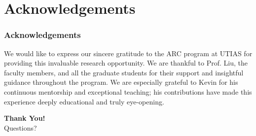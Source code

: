 \documentclass{beamer}
\begin{document}
\section{Acknowledgements}

\begin{frame}
\frametitle{Acknowledgements}
We would like to express our sincere gratitude to the ARC program at UTIAS for providing this invaluable research opportunity. We are thankful to Prof. Liu, the faculty members, and all the graduate students for their support and insightful guidance throughout the program. We are especially grateful to Kevin for his continuous mentorship and exceptional teaching; his contributions have made this experience deeply educational and truly eye-opening.
\end{frame}

\begin{frame}
\centering
\Huge \textbf{Thank You!} \\
\vspace{0.5cm}
\large Questions?
\end{frame}
\end{document}
